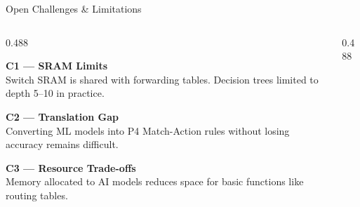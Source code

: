 {
\begin{frame}{Open Challenges \& Limitations}
\vspace{4pt}

  \begin{columns}[T, totalwidth=\textwidth]

    \begin{column}{0.488\textwidth}

      \begin{tcolorbox}[problemcard=problemorange]
        {\color{problemorange}\bfseries\scriptsize
          C1 — SRAM Limits}\\[2pt]
        {\fontsize{7}{8}\selectfont\color{HUAdark}
          Switch SRAM is shared with forwarding tables.
          Decision trees limited to depth 5--10 in practice.}
      \end{tcolorbox}

      \vspace{4pt}

      \begin{tcolorbox}[problemcard=problemorange]
        {\color{problemorange}\bfseries\scriptsize
          C2 — Translation Gap}\\[2pt]
        {\fontsize{7}{8}\selectfont\color{HUAdark}
          Converting ML models into P4 Match-Action
          rules without losing accuracy remains difficult.}
      \end{tcolorbox}

      \vspace{4pt}

      \begin{tcolorbox}[problemcard=problemorange]
        {\color{problemorange}\bfseries\scriptsize
          C3 — Resource Trade-offs}\\[2pt]
        {\fontsize{7}{8}\selectfont\color{HUAdark}
          Memory allocated to AI models reduces space
          for basic functions like routing tables.}
      \end{tcolorbox}

    \end{column}

    \begin{column}{0.488\textwidth}


\end{column}
\end{columns}
\end{frame}}

